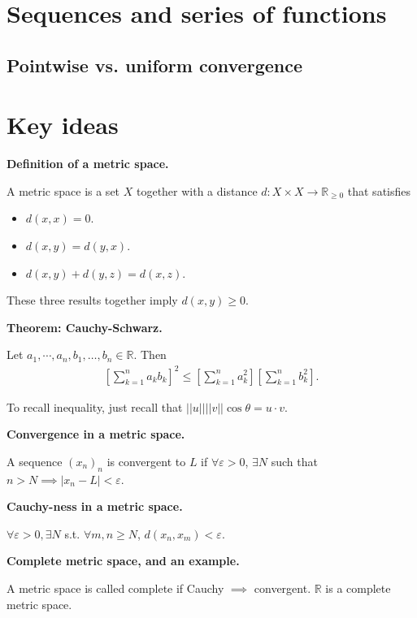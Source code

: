 \documentclass[12pt]{article}
\newcommand{\RR}{\mathbb{R}}
\begin{document}
  \section{Sequences and series of functions}

  \subsection{Pointwise vs. uniform convergence}

\newpage

\section{Key ideas}

{\bf Definition of a metric space.}

A metric space is a set $X$ together with a distance $d: X \times X \to \RR_{\geq 0}$ that satisfies

\begin{itemize}
  \item $d(x, x) = 0$.
  \item $d(x, y) = d(y,x)$.
  \item $d(x, y) + d(y, z) = d(x, z)$.
\end{itemize}

These three results together imply $d(x, y) \geq 0$.


{\bf Theorem: Cauchy-Schwarz.}

Let $a_1, \cdots, a_n, b_1, \dots, b_n \in \RR$.  Then
\begin{align*}
  \left[ \sum_{k=1}^{n} a_k b_k \right]^2 \leq \left[ \sum_{k=1}^{n}a_k^2 \right] \left[ \sum_{k=1}^{n} b_k^2 \right].
\end{align*}

To recall inequality, just recall that $||u|| ||v|| \cos \theta = u \cdot v$.

{\bf Convergence in a metric space.} 

A sequence $(x_n)_n$ is convergent to $L$ if $\forall \varepsilon > 0$, $\exists N$ such that $n > N \implies |x_n - L| < \varepsilon$.

{\bf Cauchy-ness in a metric space.}

$\forall \varepsilon > 0, \exists N$ s.t. $\forall m, n \geq N$, $d(x_n, x_m) < \varepsilon$.

{\bf Complete metric space, and an example.}

A metric space is called complete if Cauchy $\implies $ convergent.  $\RR$ is a complete metric space.
\end{document}
